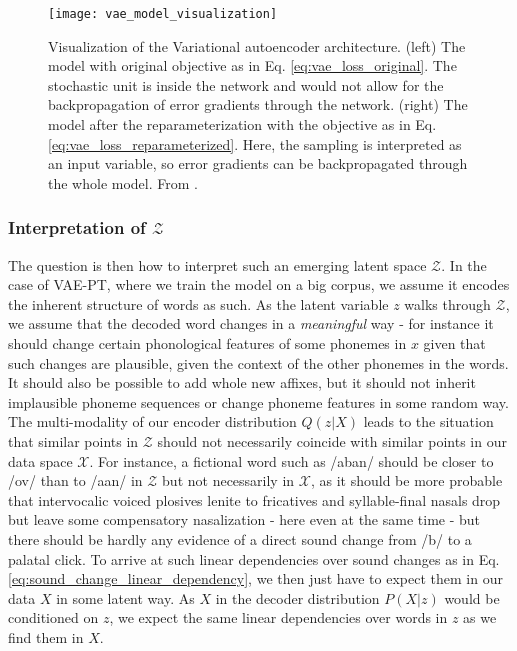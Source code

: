 \documentclass[6pt]{article}
\begin{document}
\begin{figure}[h!] %
   \centering
   \texttt{[image: vae\_model\_visualization]} 
   \caption{Visualization of the Variational autoencoder architecture. (left) The model with original objective as in Eq. \ref{eq:vae_loss_original}. The stochastic unit is inside the network and would not allow for the backpropagation of error gradients through the network. (right) The model after the reparameterization with the objective as in Eq. \ref{eq:vae_loss_reparameterized}. Here, the sampling is interpreted as an input variable, so error gradients can be backpropagated through the whole model. From \cite{doersch2016tutorial}.}
   \label{fig:vae_model_visualization}
\end{figure}



\subsubsection{Interpretation of $\mathcal{Z}$}
\label{interpretation_of_z}
The question is then how to interpret such an emerging latent space $\mathcal{Z}$. In the case of VAE-PT, where we train the model on a big corpus, we assume it encodes the inherent structure of words as such. As the latent variable $z$ walks through $\mathcal{Z}$, we assume that the decoded word changes in a \textit{meaningful} way - for instance it should change certain phonological features of some phonemes in $x$ given that such changes are plausible, given the context of the other phonemes in the words. It should also be possible to add whole new affixes, but it should not inherit implausible phoneme sequences or change phoneme features in some random way. The multi-modality of our encoder distribution $Q(z|X)$ leads to the situation that similar points in $\mathcal{Z}$ should not necessarily coincide with similar points in our data space $\mathcal{X}$. For instance, a fictional word such as /aban/ should be closer to /ov/ than to /a\textipa{\textdoublebarpipe}an/ in $\mathcal{Z}$ but not necessarily in $\mathcal{X}$, as it should be more probable that intervocalic voiced plosives lenite to fricatives and syllable-final nasals drop but leave some compensatory nasalization - here even at the same time - but there should be hardly any evidence of a direct sound change from /b/ to a palatal click. To arrive at such linear dependencies over sound changes as in Eq. \ref{eq:sound_change_linear_dependency}, we then just have to expect them in our data $X$ in some latent way. As $X$ in the decoder distribution $P(X|z)$ would be conditioned on $z$, we expect the same linear dependencies over words in $z$ as we find them in $X$.
\end{document}
